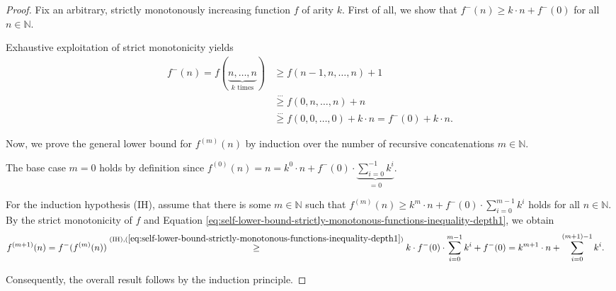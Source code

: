 \begin{proof}
	Fix an arbitrary, strictly monotonously increasing function $f$ of arity $k$.
	First of all, we show that $f^{-}(n)\geq k\cdot n + f^{-}(0)$ for all $n\in\mathbb{N}$.
	
	Exhaustive exploitation of strict monotonicity yields
	\begin{align}
		f^{-}(n)=f(\underbrace{n,\dots,n}_{k \text{ times}})&\geq f(n-1,n,\dots,n)+1\\
		&\overset{\dots}{\geq} f(0,n,\dots,n)+n \\
		&\overset{\dots}{\geq} f(0,0,\dots,0)+k\cdot n = f^{-}(0) + k\cdot n.
		\label{eq:self-lower-bound-strictly-monotonous-functions-integer-inequality-depth1}
	\end{align} 
	
	Now, we prove the general lower bound for $f^{(m)}(n)$ by induction over the number of recursive concatenations $m\in\mathbb{N}$.
	
	The base case $m=0$ holds by definition since $f^{(0)}(n)=n=k^0\cdot n + f^{-}(0)\cdot\underbrace{\sum_{i=0}^{-1}k^i}_{=0}$.
	
	For the induction hypothesis (IH), assume that there is some $m\in\mathbb{N}$ such that $f^{(m)}(n)\geq k^m\cdot n + f^{-}(0)\cdot\sum_{i=0}^{m-1}k^i$ holds for all $n\in\mathbb{N}$.
	By the strict monotonicity of $f$ and Equation \ref{eq:self-lower-bound-strictly-monotonous-functions-inequality-depth1}, we obtain
	\begin{align}
		\label{eq:self-lower-bound-strictly-monotonous-functions-integer-inequality-induction-step}
		f^{(m+1)}(n)&=f^{-}(f^{(m)}(n)) \overset{\text{(IH)},(\ref{eq:self-lower-bound-strictly-monotonous-functions-inequality-depth1})}{\geq} k\cdot f^{-}(0)\cdot\sum_{i=0}^{m-1}k^i + f^{-}(0) = k^{m+1} \cdot n + \sum_{i=0}^{(m+1)-1}k^i. 
	\end{align}
	
	Consequently, the overall result follows by the induction principle.
\end{proof}


